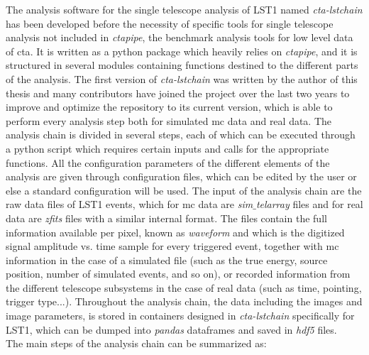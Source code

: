 \documentclass[main.tex]{subfiles}
\begin{document}
The analysis software for the single telescope analysis of LST1 named \textit{cta-lstchain} has been developed before the necessity of specific tools for single telescope analysis not included in \textit{ctapipe}, the benchmark analysis tools for low level data of \gls{cta}. It is written as a python package which heavily relies on \textit{ctapipe}, and it is structured in several modules containing functions destined to the different parts of the analysis. The first version of \textit{cta-lstchain} was written by the author of this thesis and many contributors have joined the project over the last two years to improve and optimize the repository to its current version, which is able to perform every analysis step both for simulated \gls{mc} data and real data. The analysis chain is divided in several steps, each of which can be executed through a python script which requires certain inputs and calls for the appropriate functions. All the configuration parameters of the different elements of the analysis are given through configuration files, which can be edited by the user or else a standard configuration will be used. The input of the analysis chain are the raw data files of LST1 events, which for \gls{mc} data are \textit{sim$\_$telarray} files and for real data are \textit{zfits} files with a similar internal format. The files contain the full information available per pixel, known as \textit{waveform} and which is the digitized signal amplitude vs. time sample for every triggered event, together with \gls{mc} information in the case of a simulated file (such as the true energy, source position, number of simulated events, and so on), or recorded information from the different telescope subsystems in the case of real data (such as time, pointing, trigger type...). Throughout the analysis chain, the data including the images and image parameters, is stored in containers designed in \textit{cta-lstchain} specifically for LST1, which can be dumped into \textit{pandas} dataframes and saved in \textit{hdf5} files.\\
The main steps of the analysis chain can be summarized as: \\
\end{document}
